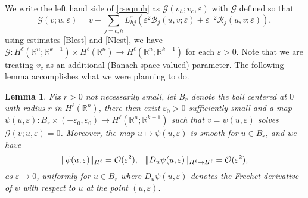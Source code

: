 \documentclass[letterpaper,11pt]{article}
\newcommand{\R}{\mathbb{R}}
\newcommand{\rmO}{\mathcal{O}}
\newcommand{\eps}{\varepsilon}
\newcommand{\B}{\mathcal{B}}
\newcommand{\Rm}{\mathcal{R}}
\newcommand{\G}{\mathcal{G}}
\numberwithin{equation}{section}
\theoremstyle{plain}
\newtheorem{lemma}[theorem]{Lemma}
\theoremstyle{remark}
\begin{document}
We write the left hand side of \eqref{rseqnuh} as $\G(v_h; v_c,\eps)$ with $\G$ defined so that
\[
\G(v;u,\eps) = v+ \sum_{j=c,h} L_{hj}^{\eps}\left( \eps^2\B_j(u,v;\eps)+\eps^{-2}\Rm_j(u,v;\eps) \right), 
\]
using estimates \eqref{Blest} and \eqref{Nlest}, we have $\G : H^\ell(\R^n;\R^{k-1}) \times H^\ell(\R^n) \to H^\ell(\R^n;\R^{k-1})$ for each $\eps >0$.
Note that we are treating $v_c$ as an additional (Banach space-valued) parameter. The following lemma accomplishes what we were planning to do.
\begin{lemma}\label{Lemuh} Fix $r>0$ not necessarily small, let $B_r$ denote the ball centered at $0$ with radius $r$ in $H^\ell(\R^n)$, there then exist $\eps_0>0$ sufficiently small and a map $\psi(u,\eps): B_r \times (-\eps_0,\eps_0) \to H^\ell(\R^n;\R^{k-1})$ such that $v = \psi(u, \eps)$ solves $\G(v;u,\eps) = 0$. Moreover, the map $u \mapsto \psi(u,\eps)$ is smooth for $u\in B_r$, and we have 
\[
\|\psi(u,\eps)\|_{H^\ell} = \rmO(\eps^2), \hspace{0.1in}\|D_u\psi(u,\eps)\|_{H^\ell \to H^\ell} = \rmO(\eps^2),
\] as 
$\eps \to 0$, uniformly for $u\in B_r$ where $D_u\psi(u,\eps)$ denotes the Frechet derivative of $\psi$ with respect to $u$ at the point $(u,\eps)$.  \end{lemma}
\end{document}
